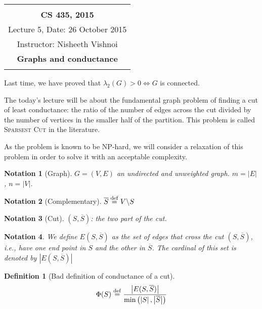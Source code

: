 \documentclass[12pt]{article}
\newtheorem{definition}[lemma]{Definition}
\newtheorem{notation}{Notation}
\newcommand{\defeq}{\stackrel{{\rm def}}{=}}
\newcommand{\LRa}{\Leftrightarrow}
\newcommand{\card}[1]{\left\lvert#1\right\rvert}
\newcommand{\NP}{\textsc{NP}}
\begin{document}
\begin{center}
\begin{tabular}{|c|}
\hline
\\
{\bf CS 435, 2015} \\
 Lecture 5, Date: 26 October 2015\\
Instructor: Nisheeth Vishnoi \\
{\bfseries \large Graphs and conductance} \\ \\ \hline
\end{tabular}
\end{center}


Last time, we have proved that $\lambda_2(G) > 0 \LRa G$ is connected.

The today's lecture will be about the fundamental graph problem of finding a cut of least conductance: the ratio of the number of edges across the cut divided by the number of vertices in the smaller half of the partition. This problem is called \textsc{Sparsest Cut} in the literature.

As the problem is known to be \NP-hard, we will consider a relaxation of this problem in order to solve it with an acceptable complexity.


\begin{notation}[Graph]
    $G = (V,E)$ an undirected and unweighted graph. $m=\lvert E\rvert$, $n=\lvert V\rvert$.
\end{notation}

\begin{notation}[Complementary]
    $\overline{S}\defeq V\backslash S$
\end{notation}

\begin{notation}[Cut]
    $(S,\overline{S})$: the two part of the cut.
\end{notation}
    
\begin{notation}
    We define $E(S,\overline{S})$ as the set of edges that cross the cut  $(S,\overline{S})$, i.e., have one end point in $S$ and the other in $\overline{S}$. The cardinal of this set is denoted by $\card{E(S,\overline{S})}$
\end{notation}    
    
\begin{definition}[Bad definition of conductance of a cut]
    \[
        \Phi(S) \defeq \frac{\card{E(S,\overline{S})}}{\min\left(\card{S},\card{\overline{S}}\right)}
    \]
\end{definition}
\end{document}
